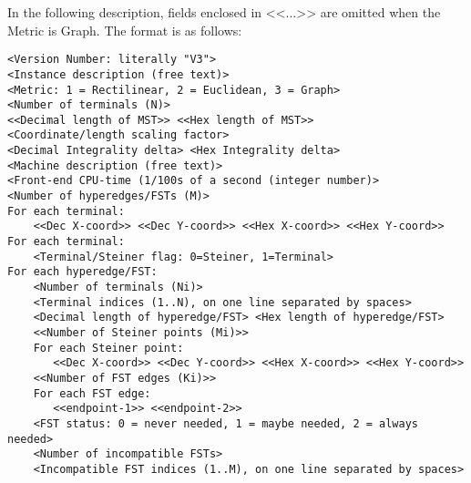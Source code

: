 \documentclass[12pt,twoside,letterpaper]{article}
\def\code#1{{\ttfamily #1}}
\begin{document}
In the following description, fields enclosed in \code{<<...>>} are
omitted when the Metric is Graph.  The format is as follows:

{\footnotesize
\begin{verbatim}
<Version Number: literally "V3">
<Instance description (free text)>
<Metric: 1 = Rectilinear, 2 = Euclidean, 3 = Graph>
<Number of terminals (N)>
<<Decimal length of MST>> <<Hex length of MST>>
<Coordinate/length scaling factor>
<Decimal Integrality delta> <Hex Integrality delta>
<Machine description (free text)>
<Front-end CPU-time (1/100s of a second (integer number)>
<Number of hyperedges/FSTs (M)>
For each terminal:
    <<Dec X-coord>> <<Dec Y-coord>> <<Hex X-coord>> <<Hex Y-coord>>
For each terminal:
    <Terminal/Steiner flag: 0=Steiner, 1=Terminal>
For each hyperedge/FST:
    <Number of terminals (Ni)>
    <Terminal indices (1..N), on one line separated by spaces>
    <Decimal length of hyperedge/FST> <Hex length of hyperedge/FST>
    <<Number of Steiner points (Mi)>>
    For each Steiner point:
       <<Dec X-coord>> <<Dec Y-coord>> <<Hex X-coord>> <<Hex Y-coord>>
    <<Number of FST edges (Ki)>>
    For each FST edge:
       <<endpoint-1>> <<endpoint-2>>
    <FST status: 0 = never needed, 1 = maybe needed, 2 = always needed>
    <Number of incompatible FSTs>
    <Incompatible FST indices (1..M), on one line separated by spaces>
\end{verbatim}
}
\end{document}
